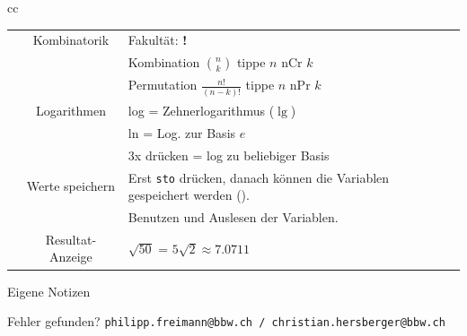 \begin{tabular}{cc}
\begin{tabular}{c|c|p{80mm}}
\tiprobutton{ncrnpr}       &Kombinatorik      &  Fakultät: {\color{red}\textbf{!}}\\
                           &                  &  Kombination $n \choose k$ tippe $n$ nCr $k$\\
                           &                  &  Permutation $\frac{n!}{(n-k)!}$ tippe $n$ nPr $k$\\\hline
\tiprobutton{ln_log}       &  Logarithmen     &  log = Zehnerlogarithmus ($\lg$)\\
                           &                  &  ln  = Log. zur Basis $e$\\
                           &                  &  3x drücken = log zu beliebiger Basis\\\hline
\tiprobutton{sto_recall}   & Werte speichern  &  Erst \texttt{sto} drücken, danach können die Variablen gespeichert werden (\tiprobutton{xyzabcd}). \\\hline
\tiprobutton{xyzabcd}      &                  & Benutzen und Auslesen der Variablen.\\\hline
\tiprobutton{approx}       & Resultat-Anzeige  & $\sqrt{50}$ = $5\sqrt{2} \approx 7.0711$
\end{tabular}
\end{tabular}

\keinHeaderUndKeinFooter{}

%
\noTRAINER{\vspace{15mm}}%
%
%
\keinHeaderUndKeinFooter{}
\newpage
\keinHeaderUndKeinFooter{}


Eigene Notizen\\

%
%
%
\vspace{5mm}

Fehler gefunden? \texttt{philipp.freimann@bbw.ch / christian.hersberger@bbw.ch}




